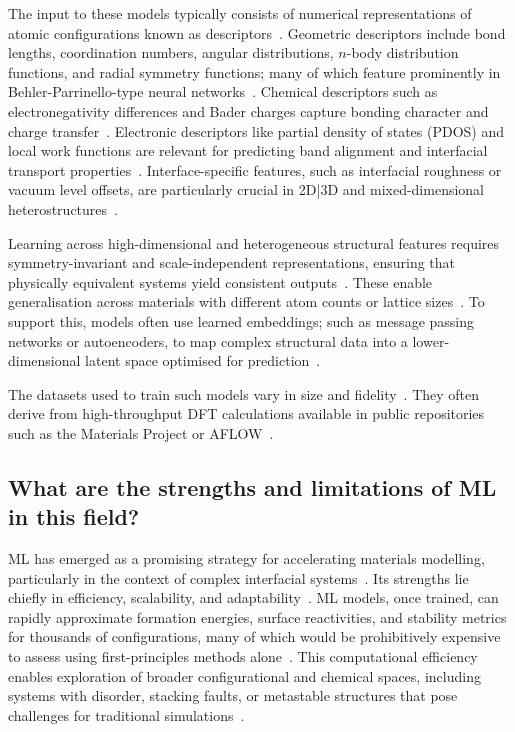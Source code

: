 The input to these models typically consists of numerical representations of atomic configurations known as descriptors~\nocite{}.
Geometric descriptors include bond lengths, coordination numbers, angular distributions, $n$-body distribution functions, and radial symmetry functions; many of which feature prominently in Behler-Parrinello-type neural networks~\cite{Behler2007-nu, Zuo2019-wo}.
Chemical descriptors such as electronegativity differences and Bader charges capture bonding character and charge transfer~\cite{Schutt2019-sz, Rosen2022-pw}.
Electronic descriptors like partial density of states (PDOS) and local work functions are relevant for predicting band alignment and interfacial transport properties~\cite{Gerber2023-yd}.
Interface-specific features, such as interfacial roughness or vacuum level offsets, are particularly crucial in 2D|3D and mixed-dimensional heterostructures~\cite{Taylor2023-wh, Butler2019-ws, Di_Liberto2022-gz}.

Learning across high-dimensional and heterogeneous structural features requires symmetry-invariant and scale-independent representations, ensuring that physically equivalent systems yield consistent outputs~\nocite{}.
These enable generalisation across materials with different atom counts or lattice sizes~\cite{Batzner2022-fd, Bartok2017-tk, Schutt2019-sz}.
To support this, models often use learned embeddings; such as message passing networks or autoencoders, to map complex structural data into a lower-dimensional latent space optimised for prediction~\cite{Batzner2022-fd, Bartok2017-tk}.

The datasets used to train such models vary in size and fidelity~\nocite{}.
They often derive from high-throughput DFT calculations available in public repositories such as the Materials Project or AFLOW~\cite{materials_project_nextgen, aflowlib}.

\newpage \subsection*{What are the strengths and limitations of ML in this field?}

ML has emerged as a promising strategy for accelerating materials modelling, particularly in the context of complex interfacial systems~\nocite{}.
Its strengths lie chiefly in efficiency, scalability, and adaptability~\cite{Batzner2022-fd, Khot2025-hh, Schutt2018-xc}.
ML models, once trained, can rapidly approximate formation energies, surface reactivities, and stability metrics for thousands of configurations, many of which would be prohibitively expensive to assess using first-principles methods alone~\nocite{}.
This computational efficiency enables exploration of broader configurational and chemical spaces, including systems with disorder, stacking faults, or metastable structures that pose challenges for traditional simulations~\cite{Batzner2022-fd, Rosen2022-pw, Schutt2018-xc}.

